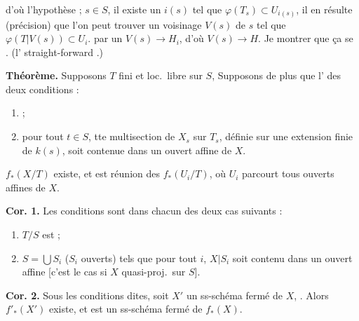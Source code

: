 \documentclass[11pt,a4paper]{article}
\begin{document}

d'où l'hypothèse  ;  $s\in S$, il existe un $i(s)$ tel que
$\varphi(T_s)\subset U_{i(s)}$, il en résulte (précision) que l'on peut trouver un voisinage \struck{\ill{}} $V(s)$ de $s$
tel que $\varphi(T|V(s))\subset U_i$.   par un
 $V(s)\to H_i$, d'où $V(s)\to H$. Je  montrer que ça se . (l'\ill{}
straight-forward \ill{}.)

\textbf{Théorème.} Supposons $T$ fini et loc.\ libre sur $S$,
Supposons de plus que  l' des deux conditions  \struck{\ill{}} :
\begin{enumerate}
  \item[(i)]  ;
  \item[(ii)] pour tout $t\in S$, tte multisection de $X_s$ sur $T_s$, définie sur
  une extension finie de $k(s)$, soit contenue dans un ouvert affine de $X$.
\end{enumerate}
$f_{*}(X/T)$ existe, et est réunion des
$f_{*}(U_i/T)$, où $U_i$ parcourt tous ouverts affines de $X$.

\textbf{Cor. 1.} Les conditions   sont
 dans chacun des deux cas suivants :
\begin{enumerate}
  \item[(i)] $T/S$ est \ill{} \struck{\ill{}}  ;
  \item[(ii)] $S=\bigcup S_i$ ($S_i$ ouverts) tels que pour tout $i$,  $X|S_i$ soit contenu dans un
  ouvert affine [c'est le cas si $X$ quasi-proj.\ sur $S$].
\end{enumerate}

\textbf{Cor. 2.} Sous les conditions dites, soit $X'$ un ss-schéma fermé de $X$, . Alors $f'_{*}(X')$ existe, et est un ss-schéma fermé de $f_{*}(X)$.
\end{document}
